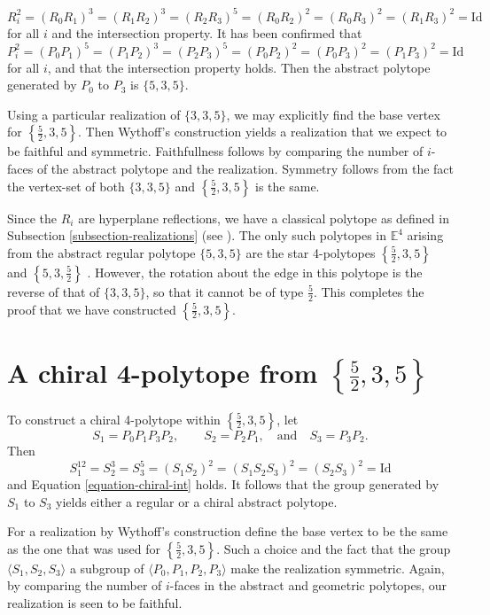 \documentclass{amsart}
\begin{document}
$$
R_i^2=(R_0R_1)^3=(R_1R_2)^3=(R_2R_3)^5=(R_0R_2)^2=(R_0R_3)^2=(R_1R_3)^2=\text{Id}
$$
for all $i$ and the intersection property. It has been confirmed that
$$
P_i^2=(P_0P_1)^5=(P_1P_2)^3=(P_2P_3)^5=(P_0P_2)^2=(P_0P_3)^2=(P_1P_3)^2=\text{Id}
$$
for all $i$, and that the intersection property holds. 
Then the abstract polytope generated by $P_0$ to $P_3$ is
$\{5,3,5\}$.

Using a particular realization of $\{3,3,5\}$, we may explicitly find the base
vertex for $\left\{\frac{5}{2},3,5\right\}$. Then Wythoff's construction yields
a realization that we expect to be faithful and symmetric. Faithfullness follows
by comparing the number of $i$-faces of the abstract polytope and the
realization. Symmetry follows from the fact the vertex-set of both $\{3,3,5\}$
and $\left\{\frac{5}{2},3,5\right\}$ is the same.
	
Since the $R_i$ are hyperplane reflections, we have a classical polytope as
defined in Subsection \ref{subsection-realizations} (see
\cite{mcmullen-4dimensional}). The only such polytopes in $\mathbb{E}^4$ arising
from the abstract regular polytope $\{5,3,5\}$ are the star 4-polytopes
$\left\{\frac{5}{2},3,5\right\}$ and $\left\{5,3,\frac{5}{2}\right\}$
\cite[Theorem 7D13]{ARP}. However, the rotation about the edge in this polytope
is the reverse of that of $\{3,3,5\}$, so that it cannot be of type
$\frac{5}{2}$. This completes the proof that we have constructed
$\left\{\frac{5}{2},3,5\right\}$.
	
\section{A chiral 4-polytope from $\left\{\frac{5}{2},3,5\right\}$}
\label{section-a-chiral-4-polytope-from-52-3-5}

To construct a chiral 4-polytope within $\left\{\frac{5}{2},3,5\right\}$, let
$$
S_1=P_0P_1P_3P_2,\qquad S_2=P_2P_1,\quad\text{and}\quad S_3=P_3P_2.
$$
Then
\begin{equation}
\label{equation-string-chiral}
S_1^{12}=S_2^3=S_3^5=(S_1S_2)^2=(S_1S_2S_3)^2=(S_2S_3)^2=\text{Id}
\end{equation}
and Equation \ref{equation-chiral-int} holds. It follows that
the group generated by $S_1$ to $S_3$ yields either a regular or a chiral
abstract polytope.
	
For a realization by Wythoff's construction define the base vertex to be the
same as the one that was used for $\left\{\frac{5}{2},3,5\right\}$. Such a
choice and the fact that the group $\langle S_1,S_2,S_3\rangle$ a subgroup of
$\langle P_0,P_1,P_2,P_3\rangle$ make the realization symmetric. Again, by
comparing the number of $i$-faces in the abstract and geometric polytopes, our
realization is seen to be faithful.
	
\end{document}
